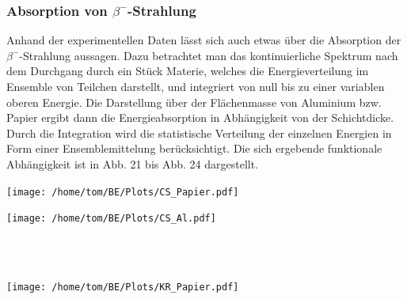 \documentclass[german,  %
parskip=full,  %
]{scrartcl}
\begin{document}
\subsubsection{Absorption von \(\beta^-\)-Strahlung}
Anhand der experimentellen Daten lässt sich auch etwas über die Absorption der \(\beta^-\)-Strahlung aussagen. Dazu betrachtet man das kontinuierliche Spektrum nach dem Durchgang durch ein Stück Materie, welches die Energieverteilung im Ensemble von Teilchen darstellt, und integriert von null bis zu einer variablen oberen Energie. Die Darstellung über der Flächenmasse von Aluminium bzw. Papier ergibt dann die Energieabsorption in Abhängigkeit von der Schichtdicke. Durch die Integration wird die statistische Verteilung der einzelnen Energien in Form einer Ensemblemittelung berücksichtigt. Die sich ergebende funktionale Abhängigkeit ist in Abb. 21 bis Abb. 24 dargestellt.\\
\begin{minipage}{0.5\textwidth}\centering
\texttt{[image: /home/tom/BE/Plots/CS\_Papier.pdf]}
\end{minipage}
\begin{minipage}{0.5\textwidth}\centering
\texttt{[image: /home/tom/BE/Plots/CS\_Al.pdf]}
\end{minipage} \\\\
\begin{minipage}{0.5\textwidth}\centering
\texttt{[image: /home/tom/BE/Plots/KR\_Papier.pdf]}
\end{minipage}
\end{document}
